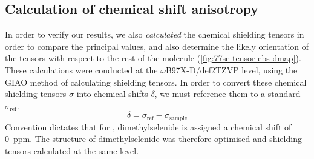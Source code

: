 \begin{refsection}
\subsection{Calculation of chemical shift anisotropy}
In order to verify our results, we also \emph{calculated} the chemical shielding tensors in order to compare the principal values, and also determine the likely orientation of the tensors with respect to the rest of the molecule (\cref{fig:77se-tensor-ebs-dmap}).
These calculations were conducted at the $\omega$B97X-D/def2TZVP level, using the GIAO method of calculating shielding tensors.\autocite{Schreckenbach1995CalculationTheory,Schreckenbach1996TheApproximation}
In order to convert these chemical shielding tensors $\sigma$ into chemical shifts $\delta$, we must reference them to a standard $\sigma_{\textrm{ref}}$.
\begin{equation}
  \delta = \sigma_{\textrm{ref}} - \sigma_{\textrm{sample}}
  \label{eqn:shieldingtoshift}
\end{equation}
Convention dictates that for , dimethylselenide is assigned a chemical shift of 0~ppm.
The structure of dimethylselenide was therefore optimised and shielding tensors calculated at the same level.


\end{refsection}
